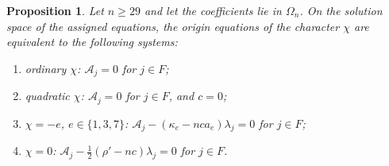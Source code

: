 \documentclass{amsart}
\newtheorem{proposition}[theorem]{Proposition}
\theoremstyle{definition}
\theoremstyle{remark}
\numberwithin{equation}{section}
\begin{document}
\begin{proposition}\label{prop:origin}
Let $n\ge29$ and let the coefficients lie in $\Omega_n$. On the solution space of the
assigned equations, the origin equations of the character $\chi$ are equivalent to
the following systems:
\begin{enumerate}[label=\textup{(\roman*)}]
\item ordinary $\chi$: $\mathcal A_j=0$ for $j\in F$;
\item quadratic $\chi$: $\mathcal A_j=0$ for $j\in F$, and $c=0$;
\item $\chi=-e$, $e\in\{1,3,7\}$: $\mathcal A_j-(\kappa_e-nca_e)\lambda_j=0$ for
$j\in F$;
\item $\chi=0$: $\mathcal A_j-\tfrac12(\rho'-nc)\lambda_j=0$ for $j\in F$.
\end{enumerate}
\end{proposition}
\end{document}

